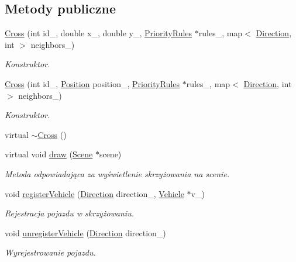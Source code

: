 \subsection*{Metody publiczne}
\begin{DoxyCompactItemize}
\item 
\hyperlink{class_cross_ad0886f2b47a4375b7b6feedfc13c0692}{Cross} (int id\-\_\-, double x\-\_\-, double y\-\_\-, \hyperlink{class_priority_rules}{Priority\-Rules} $\ast$rules\-\_\-, map$<$ \hyperlink{_direction_8h_a224b9163917ac32fc95a60d8c1eec3aa}{Direction}, int $>$ neighbors\-\_\-)
\begin{DoxyCompactList}\small\item\em Konstruktor. \end{DoxyCompactList}\item 
\hyperlink{class_cross_afa046c5821fd92064ecfdcb2c28fae00}{Cross} (int id\-\_\-, \hyperlink{struct_position}{Position} position\-\_\-, \hyperlink{class_priority_rules}{Priority\-Rules} $\ast$rules\-\_\-, map$<$ \hyperlink{_direction_8h_a224b9163917ac32fc95a60d8c1eec3aa}{Direction}, int $>$ neighbors\-\_\-)
\begin{DoxyCompactList}\small\item\em Konstruktor. \end{DoxyCompactList}\item 
virtual \hyperlink{class_cross_a1d87d50bd56692c7ed29640b0f7d1d81}{$\sim$\-Cross} ()
\item 
virtual void \hyperlink{class_cross_a3b127c19a196ad86bbd27b513eecdf44}{draw} (\hyperlink{class_scene}{Scene} $\ast$scene)
\begin{DoxyCompactList}\small\item\em Metoda odpowiadająca za wyświetlenie skrzyżowania na scenie. \end{DoxyCompactList}\item 
void \hyperlink{class_cross_a01b9a1199aa8a1cc8f7c2a4268eb2656}{register\-Vehicle} (\hyperlink{_direction_8h_a224b9163917ac32fc95a60d8c1eec3aa}{Direction} direction\-\_\-, \hyperlink{class_vehicle}{Vehicle} $\ast$v\-\_\-)
\begin{DoxyCompactList}\small\item\em Rejestracja pojazdu w skrzyżowaniu. \end{DoxyCompactList}\item 
void \hyperlink{class_cross_a02405bee42d1e6faf6450d8198e1cb45}{unregister\-Vehicle} (\hyperlink{_direction_8h_a224b9163917ac32fc95a60d8c1eec3aa}{Direction} direction\-\_\-)
\begin{DoxyCompactList}\small\item\em Wyrejestrowanie pojazdu. \end{DoxyCompactList}\item 

\end{DoxyCompactItemize}
